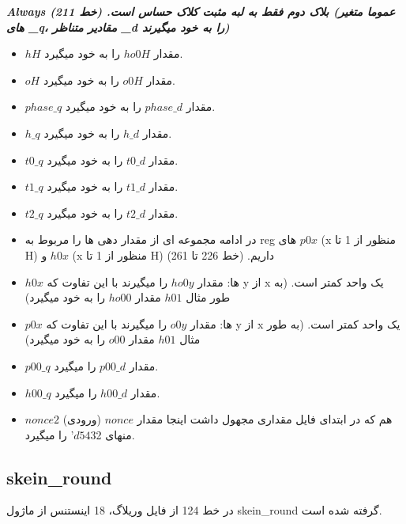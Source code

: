 \textit{\textbf{Always بلاک دوم فقط به لبه مثبت کلاک حساس است. (خط 211)
	(عموما متغیر های \_q، مقادیر متناظر \_d را به خود میگیرند) }}
\begin{itemize}
	\item
	      $hH$ مقدار $ho0H$ را به خود میگیرد.
	\item
	      $oH$ مقدار $o0H$ را به خود میگیرد.
	\item
	      $phase\_q$ مقدار $phase\_d$ را به خود میگیرد.
	\item
	      $h\_q$ مقدار $h\_d$ را به خود میگیرد.
	\item
	      $t0\_q$ مقدار $t0\_d$ را به خود میگیرد.
	\item
	      $t1\_q$ مقدار $t1\_d$ را به خود میگیرد.
	\item
	      $t2\_q$ مقدار $t2\_d$ را به خود میگیرد.
	\item
	      در ادامه مجموعه ای از مقدار دهی ها را مربوط به reg های $p0x$ (x منظور از 1  تا H) و $h0x$ (x منظور از   1  تا H) داریم. (خط 226 تا 261)
	\item
	      $h0x$ ها: مقدار $ho0y$ را میگیرند با این تفاوت که y از x یک واحد کمتر است. (به طور مثال $h01$ مقدار $ho00$ را به خود میگیرد)
	\item
	      $p0x$  ها: مقدار $o0y$ را میگیرند با این تفاوت که y از x یک واحد کمتر است. (به طور مثال $h01$ مقدار $o00$ را به خود میگیرد)
	\item
	      $p00\_q$ مقدار $p00\_d$ را میگیرد.
	\item
	      $h00\_q$ مقدار $h00\_d$ را میگیرد.
	\item
	      $nonce2$ هم که در ابتدای فایل مقداری مجهول داشت اینجا مقدار $nonce$ (ورودی)  منهای 32$’d54$
	       را میگیرد.
\end{itemize}


\subsection{skein\_round}
در خط 124 از فایل وریلاگ، 18 اینستنس از ماژول skein\_round گرفته شده است.
